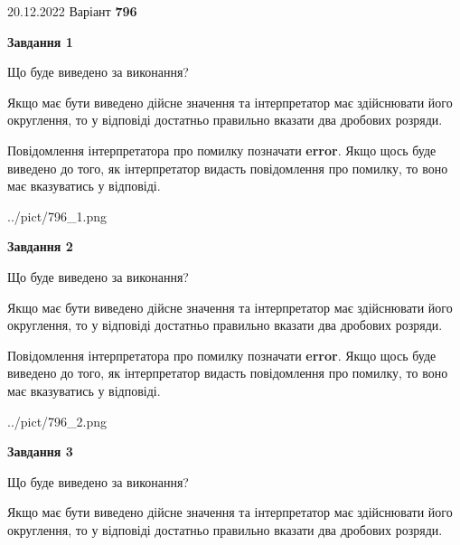 \documentclass[12pt, ukrainian]{article}
\begin{document}
{20.12.2022 Варіант \No \textbf { 796 }\par}
{
\begin {Large}

{\begin {center}\textbf{Завдання 1}\end {center}}\par
Що буде виведено за виконання? \par

Якщо має бути виведено дійсне значення та інтерпретатор має здійснювати його округлення, 
то у відповіді достатньо правильно вказати два дробових розряди.

Повідомлення інтерпретатора про помилку позначати \textbf{error}.
Якщо щось буде виведено до того, як інтерпретатор видасть повідомлення про помилку, 
то воно має вказуватись у відповіді. \par

\begin{center}
	{../pict/796_1.png}
\end{center}
\newpage

{\begin {center}\textbf{Завдання 2}\end {center}}\par
Що буде виведено за виконання? \par

Якщо має бути виведено дійсне значення та інтерпретатор має здійснювати його округлення, 
то у відповіді достатньо правильно вказати два дробових розряди.

Повідомлення інтерпретатора про помилку позначати \textbf{error}.
Якщо щось буде виведено до того, як інтерпретатор видасть повідомлення про помилку, 
то воно має вказуватись у відповіді. \par

\begin{center}
	{../pict/796_2.png}
\end{center}
\newpage

{\begin {center}\textbf{Завдання 3}\end {center}}\par
Що буде виведено за виконання? \par

Якщо має бути виведено дійсне значення та інтерпретатор має здійснювати його округлення, 
то у відповіді достатньо правильно вказати два дробових розряди.


\end{Large}}
\end{document}
